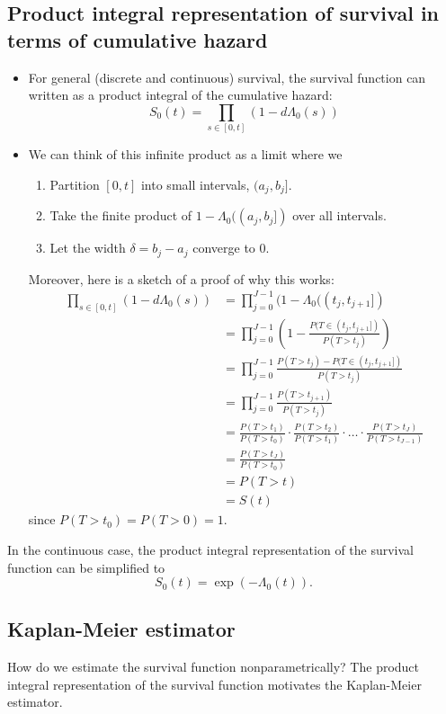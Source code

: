 \documentclass[12pt]{article}
\DeclareMathOperator{\1}{\mathds{1}}
\begin{document}
\subsection{Product integral representation of survival in terms of cumulative hazard}
\begin{itemize}
	\item For general (discrete and continuous) survival, the survival function can written as a product integral of the cumulative hazard:
	\[
	S_0(t) = \prod_{s \in [0, t]}(1 - d\Lambda_0(s))
	\]
	\item We can think of this infinite product as a limit where we 
	\begin{enumerate}
		\item Partition $[0, t]$ into small intervals, $(a_j, b_j]$.
		\item Take the finite product of $1 - \Lambda_0((a_j, b_j])$ over all intervals.
		\item Let the width $\delta = b_j - a_j$ converge to 0. 
	\end{enumerate}
	Moreover, here is a sketch of a proof of why this works: 
	\begin{align*}
		\prod_{s \in [0, t]} (1 - d\Lambda_0(s)) &= \prod_{j = 0}^{J-1} (1 - \Lambda_0((t_j, t_{j+1}]) \\
		&= \prod_{j = 0}^{J - 1}\left(1 - \frac{P(T \in (t_j, t_{j+1}])}{P(T > t_j)}\right) \\
		&= \prod_{j = 0}^{J - 1}\frac{P(T > t_j) - P(T \in (t_j, t_{j+1}])}{P(T > t_j)} \\
		&= \prod_{j = 0}^{J - 1}\frac{P(T > t_{j+1})}{P(T > t_j)} \\
		&= \frac{P(T > t_1)}{P(T > t_0)} \cdot \frac{P(T > t_2)}{P(T > t_1)} \cdot \dots \cdot \frac{P(T > t_J)}{P(T > t_{J-1})} \\
		&= \frac{P(T > t_J)}{P(T > t_0)} \\
		&= P(T > t) \\ 
		&= S(t)
	\end{align*}
	since $P(T > t_0) = P(T > 0) = 1$. 
\end{itemize}

In the continuous case, the product integral representation of the survival function can be simplified to
\[
S_0(t) = \exp(-\Lambda_0(t)).
\]

\subsection{Kaplan-Meier estimator}
How do we estimate the survival function nonparametrically? The product integral representation of the survival function motivates the Kaplan-Meier estimator.
\end{document}
